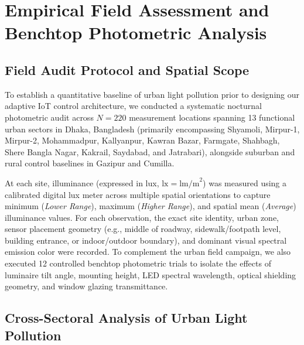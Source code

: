 \documentclass[11pt,a4paper]{article}
\begin{document}
\section{Empirical Field Assessment and Benchtop Photometric Analysis}

\subsection{Field Audit Protocol and Spatial Scope}
To establish a quantitative baseline of urban light pollution prior to designing our adaptive IoT control architecture, we conducted a systematic nocturnal photometric audit across \(N = 220\) measurement locations spanning 13 functional urban sectors in Dhaka, Bangladesh (primarily encompassing Shyamoli, Mirpur-1, Mirpur-2, Mohammadpur, Kallyanpur, Kawran Bazar, Farmgate, Shahbagh, Shere Bangla Nagar, Kakrail, Saydabad, and Jatrabari), alongside suburban and rural control baselines in Gazipur and Cumilla. 

At each site, illuminance (expressed in lux, \(\text{lx} = \text{lm/m}^2\)) was measured using a calibrated digital lux meter across multiple spatial orientations to capture minimum (\textit{Lower Range}), maximum (\textit{Higher Range}), and spatial mean (\textit{Average}) illuminance values. For each observation, the exact site identity, urban zone, sensor placement geometry (e.g., middle of roadway, sidewalk/footpath level, building entrance, or indoor/outdoor boundary), and dominant visual spectral emission color were recorded. To complement the urban field campaign, we also executed 12 controlled benchtop photometric trials to isolate the effects of luminaire tilt angle, mounting height, LED spectral wavelength, optical shielding geometry, and window glazing transmittance.

\subsection{Cross-Sectoral Analysis of Urban Light Pollution}
\end{document}
